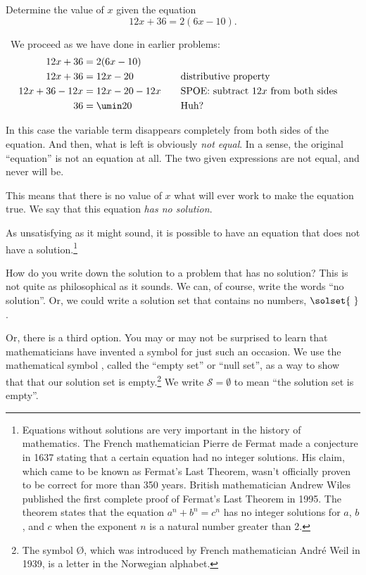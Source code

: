 \begin{boxex}
Determine the value of $x$ given the equation \[12x + 36 = 2(6x-10).\]

\exsoln\ We proceed as we have done in earlier problems:
\[\begin{aligned}
12x + 36 &= 2(6x-10)\\
12x + 36 &= 12x-20
&&\text{\quad distributive property}\\
12x+36-12x &= 12x-20-12x
&&\text{\quad SPOE: subtract $12x$ from both sides}\\
36 &= \umin20
&&\text{\quad Huh?}\\
\end{aligned}\]

In this case the variable term disappears completely from both sides of the equation. And then, what is left is obviously \textit{not equal}. In a sense, the original ``equation'' is not an equation at all. The two given expressions are not equal, and never will be.

This means that there is no value of $x$ what will ever work to make the equation true. We say that this equation \textit{has no solution}.
\end{boxex}

As unsatisfying as it might sound, it is possible to have an equation that does not have a solution.\footnote{Equations without solutions are very important in the history of mathematics. The French mathematician Pierre de Fermat made a conjecture in 1637 stating that a certain equation had no integer solutions. His claim, which came to be known as Fermat's Last Theorem, wasn't officially proven to be correct for more than 350 years. British mathematician Andrew Wiles published the first complete proof of Fermat's Last Theorem in 1995. The theorem states that the equation $a^n + b^n = c^n$ has no integer solutions for $a$, $b$, and $c$ when the exponent $n$ is a natural number greater than 2.}

How do you write down the solution to a problem that has no solution? This is not quite as philosophical as it sounds. We can, of course, write the words ``no solution''. Or, we could write a solution set that contains no numbers, $\solset{~}$.

Or, there is a third option. You may or may not be surprised to learn that mathematicians have invented a symbol for just such an occasion. We use the mathematical symbol \emptyset, called the ``empty set'' or ``null set'', as a way to show that that our solution set is empty.\footnote{The symbol \O, which was introduced by French mathematician Andr\'e Weil in 1939, is a letter in the Norwegian alphabet.} We write $\mathcal{S} = \emptyset$ to mean ``the solution set is empty''.

